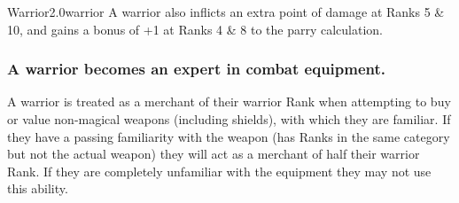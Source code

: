 \begin{skill*}{Warrior}{2.0}{warrior}
A warrior also inflicts an extra point of damage at Ranks 5 \& 10, and
gains a bonus of +1 at Ranks 4 \& 8 to the parry calculation.

\subsubsection{A warrior becomes an expert in combat equipment.}

A warrior is treated as a merchant of their warrior Rank when
attempting to buy or value non-magical weapons (including shields),
with which they are familiar. If they have a passing familiarity with
the weapon (\ie has Ranks in the same category but not the actual
weapon) they will act as a merchant of half their warrior Rank.  If
they are completely unfamiliar with the equipment they may not use
this ability.
\end{skill*}


